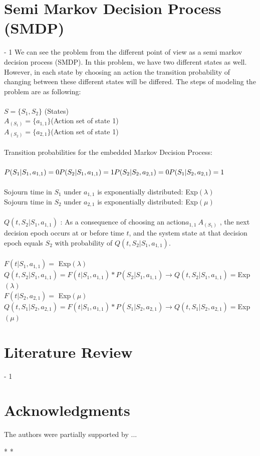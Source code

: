 \documentclass[12pt,letterpaper]{article}
\begin{document}
\section*{Semi Markov Decision Process (SMDP)}\label{sec:Semi Markov Decision Process (SMDP)}
\looseness - 1
We can see the problem from the different point of view as a semi markov decision process (SMDP). In this problem, we have two different states as well. However, in each state by choosing an action the transition probability of changing between these different states will be differed. The steps of modeling the problem are as following:\\
 \\
$S=\{S_1,S_2\}$ (States)\\
$A_{(S_1 )}=\{a_{1,1}\} $(Action set of state 1)\\
$A_{(S_2 )}=\{a_{2,1}\} $(Action set of state 1)\\
\\
Transition probabilities for the embedded Markov Decision Process:\\
\\
$ P(S_1 |S_1,a_{1,1} )=0\\
P(S_2 |S_1,a_{1,1 })=1 \\
P(S_2 |S_2,a_{2,1 })=0\\
P(S_1 |S_2,a_{2,1} )=1 $\\
\\
Sojourn time in $S_1$ under $a_{1,1}$ is exponentially distributed: Exp$(\lambda)$\\
Sojourn time in $S_2$ under $a_{2,1}$ is exponentially distributed: Exp$(\mu)$ \\
\\
$Q(t,S_2|S_1,a_{1,1 } )$ : As a consequence of choosing an action$a_{1,1 }\ A_{(S_1 )}$ , the next decision epoch occurs at or before time $t$, and the system state at that decision epoch  equals $ S_2$ with probability of $Q(t,S_2|S_1,a_{1,1 } )$.\\
\\
$F(t|S_1,a_{1,1} )=$ Exp$(\lambda) $ \\
$Q(t,S_2|S_1,a_{1,1 } )=F(t|S_1,a_{1,1} )*P(S_2 |S_1,a_{1,1 })\rightarrow Q(t,S_2|S_1,a_{1,1 } )=$Exp$(\lambda) $ \\
$F(t|S_2,a_{2,1} )=$ Exp$(\mu) $ \\
$Q(t,S_1|S_2,a_{2,1 } )=F(t|S_1,a_{1,1} )*P(S_1 |S_2,a_{2,1 })\rightarrow Q(t,S_1|S_2,a_{2,1 } )=$Exp$(\mu) $ 




\section*{Literature Review}\label{sec:lit_review}
\looseness - 1
\section*{Acknowledgments}
The authors were partially supported by ...




*
*


\end{document}
